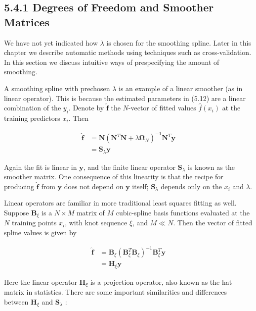 \documentclass[10pt]{article}
\begin{document}
\subsection*{5.4.1 Degrees of Freedom and Smoother Matrices}
We have not yet indicated how $\lambda$ is chosen for the smoothing spline. Later in this chapter we describe automatic methods using techniques such as cross-validation. In this section we discuss intuitive ways of prespecifying the amount of smoothing.

A smoothing spline with prechosen $\lambda$ is an example of a linear smoother (as in linear operator). This is because the estimated parameters in (5.12) are a linear combination of the $y_{i}$. Denote by $\hat{\mathbf{f}}$ the $N$-vector of fitted values $\hat{f}\left(x_{i}\right)$ at the training predictors $x_{i}$. Then


\begin{align*}
\hat{\mathbf{f}} & =\mathbf{N}\left(\mathbf{N}^{T} \mathbf{N}+\lambda \boldsymbol{\Omega}_{N}\right)^{-1} \mathbf{N}^{T} \mathbf{y} \\
& =\mathbf{S}_{\lambda} \mathbf{y} \tag{5.14}
\end{align*}


Again the fit is linear in $\mathbf{y}$, and the finite linear operator $\mathbf{S}_{\lambda}$ is known as the smoother matrix. One consequence of this linearity is that the recipe for producing $\hat{\mathbf{f}}$ from $\mathbf{y}$ does not depend on $\mathbf{y}$ itself; $\mathbf{S}_{\lambda}$ depends only on the $x_{i}$ and $\lambda$.

Linear operators are familiar in more traditional least squares fitting as well. Suppose $\mathbf{B}_{\xi}$ is a $N \times M$ matrix of $M$ cubic-spline basis functions evaluated at the $N$ training points $x_{i}$, with knot sequence $\xi$, and $M \ll N$. Then the vector of fitted spline values is given by


\begin{align*}
\hat{\mathbf{f}} & =\mathbf{B}_{\xi}\left(\mathbf{B}_{\xi}^{T} \mathbf{B}_{\xi}\right)^{-1} \mathbf{B}_{\xi}^{T} \mathbf{y} \\
& =\mathbf{H}_{\xi} \mathbf{y} \tag{5.15}
\end{align*}


Here the linear operator $\mathbf{H}_{\xi}$ is a projection operator, also known as the hat matrix in statistics. There are some important similarities and differences between $\mathbf{H}_{\xi}$ and $\mathbf{S}_{\lambda}$ :
\end{document}
